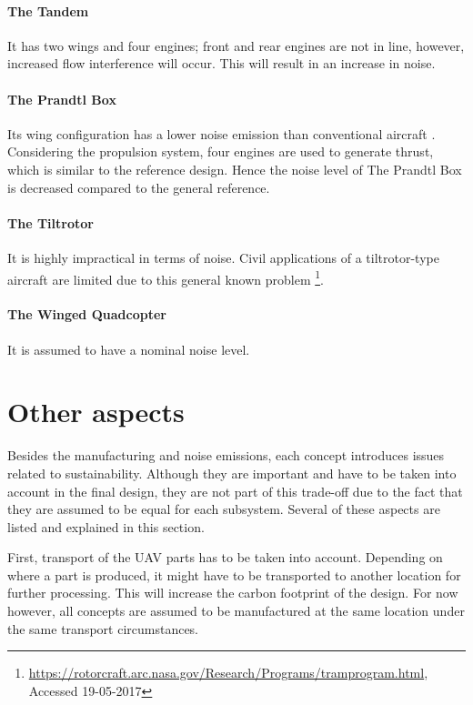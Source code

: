\paragraph{The Tandem} It has two wings and four engines; front and rear engines are not in line, however, increased flow interference will occur. This will result in an increase in noise. 

\paragraph{The Prandtl Box} Its wing configuration has a lower noise emission than conventional aircraft \cite{prandtl_noise}. Considering the propulsion system, four engines are used to generate thrust, which is similar to the reference design. Hence the noise level of The Prandtl Box is decreased compared to the general reference.

\paragraph{The Tiltrotor} It is highly impractical in terms of noise. Civil applications of a tiltrotor-type aircraft are limited due to this general known problem \footnote{\url{https://rotorcraft.arc.nasa.gov/Research/Programs/tramprogram.html}, Accessed 19-05-2017}. 


\paragraph{The Winged Quadcopter} It is assumed to have a nominal noise level.




\section{Other aspects} %

Besides the manufacturing and noise emissions, each concept introduces issues related to sustainability. Although they are important and have to be taken into account in the final design, they are not part of this trade-off due to the fact that they are assumed to be equal for each subsystem. Several of these aspects are listed and explained in this section. 

First, transport of the UAV parts has to be taken into account. Depending on where a part is produced, it might have to be transported to another location for further processing. This will increase the carbon footprint of the design. For now however, all concepts are assumed to be manufactured at the same location under the same transport circumstances.

